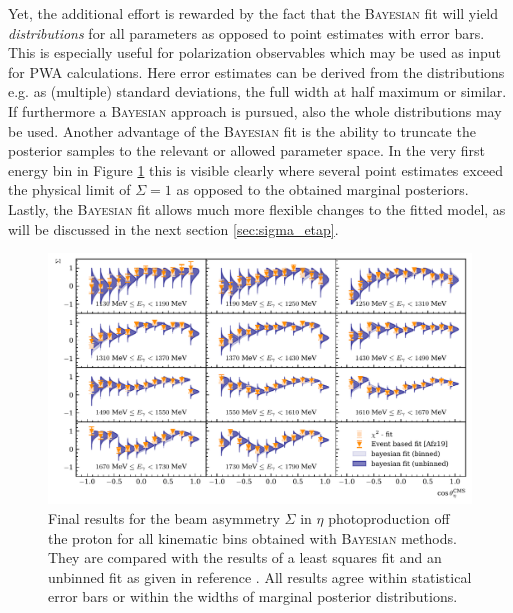 Yet, the additional effort is rewarded by the fact that the \textsc{Bayesian} fit will yield \emph{distributions} for all parameters as opposed to point estimates with error bars. This is especially useful for polarization observables which may be used as input for PWA calculations. Here error estimates can be derived from the distributions e.g. as (multiple) standard deviations, the full width at half maximum or similar. If furthermore a \textsc{Bayesian} approach is  pursued, also the whole distributions may be used. Another advantage of the \textsc{Bayesian} fit is the ability to truncate the posterior samples to the relevant or allowed parameter space. In the very first energy bin in Figure \ref{fig:eta_res} this is visible clearly where several point estimates exceed the physical limit of $\Sigma=1$ as opposed to the obtained marginal posteriors. Lastly, the \textsc{Bayesian} fit allows much more flexible changes to the fitted model, as will be discussed in the next section \ref{sec:sigma_etap}.
	\begin{figure}
		\centering
		\includegraphics[width=\linewidth]{../bayes/event_based_fit/plots/sigma_eta.pdf}
		\caption{Final results for the beam asymmetry $\Sigma$ in $\eta$ photoproduction off the proton for all kinematic bins obtained with \textsc{Bayesian} methods. They are compared with the results of a least squares fit and an unbinned fit as given in reference \cite{farahphd}. All results agree within statistical error bars or within the widths of marginal posterior distributions.}
		\label{fig:eta_res}
	\end{figure}

      
